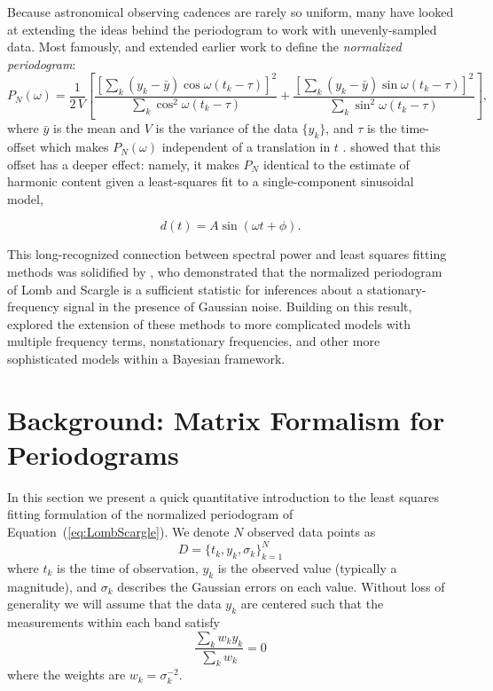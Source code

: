 \documentclass[12pt,preprint]{aastex}
\newcommand{\Eq}[1]{Equation~(\ref{eq:#1})}
\newcommand{\eq}[1]{\Eq{#1}}
\newcommand{\eqlabel}[1]{\label{eq:#1}}
\begin{document}
Because astronomical observing cadences are rarely so uniform, many have looked at extending the ideas behind the periodogram to work with unevenly-sampled data. Most famously, \citet{Lomb76} and \citet{Scargle82} extended earlier work to define the {\it normalized periodogram}:
\begin{equation}
  \eqlabel{LombScargle}
  P_N(\omega) = \frac{1}{2\,V}\left[
    \frac{\left[\sum_k(y_k - \bar{y})\cos\omega(t_k - \tau)\right]^2}
    {\sum_k \cos^2\omega(t_k - \tau)}
    +
    \frac{\left[\sum_k(y_k - \bar{y})\sin\omega(t_k - \tau)\right]^2}
    {\sum_k \sin^2\omega(t_k - \tau)}
\right],
\end{equation}
where $\bar{y}$ is the mean and $V$ is the variance of the data $\{y_k\}$, and $\tau$ is the time-offset which makes $P_N(\omega)$ independent of a translation in $t$ \citep[see][for an in-depth discussion]{NumRec}. \citet{Lomb76} showed that this offset has a deeper effect: namely, it makes $P_N$ identical to the estimate of harmonic content given a least-squares fit to a single-component sinusoidal model,

\begin{equation}
  \eqlabel{SingleModel}
  d(t) = A\sin(\omega t + \phi).
\end{equation}

This long-recognized connection between spectral power and least squares fitting methods was solidified by \citet{Jaynes87}, who demonstrated that the normalized periodogram of Lomb and Scargle is a sufficient statistic for inferences about a stationary-frequency signal in the presence of Gaussian noise. Building on this result, \citet{Bretthorst88} explored the extension of these methods to more complicated models with multiple frequency terms, nonstationary frequencies, and other more sophisticated models within a Bayesian framework.


\section{Background: Matrix Formalism for Periodograms}

In this section we present a quick quantitative introduction to the least squares fitting formulation of the normalized periodogram of \eq{LombScargle}. We denote $N$ observed data points as
\begin{equation}
  D = \{t_k, y_k, \sigma_k\}_{k=1}^N
\end{equation}
where $t_k$ is the time of observation, $y_k$ is the observed value (typically a magnitude), and $\sigma_k$ describes the Gaussian errors on each value. Without loss of generality we will assume that the data $y_k$ are centered such that the measurements within each band satisfy
\begin{equation}
  \eqlabel{ycentered}
  \frac{\sum_k w_ky_k}{\sum_k w_k} = 0
\end{equation}
where the weights are $w_k = \sigma_k^{-2}$.
\end{document}
